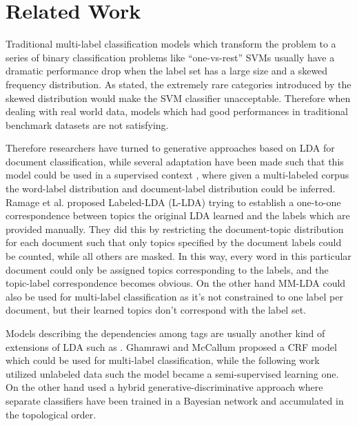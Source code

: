 \section{Related Work}
\label{sec:related}

Traditional multi-label classification models which transform the problem to a series of binary classification problems like ``one-vs-rest'' SVMs \cite{rifkin2004defense} usually have a dramatic performance drop when the label set has a large size and a skewed frequency distribution. As \cite{liu2005support} stated, the extremely rare categories introduced by the skewed distribution would make the SVM classifier unacceptable. Therefore when dealing with real world data, models which had good performances in traditional benchmark datasets are not satisfying. 

Therefore researchers have turned to generative approaches based on LDA \cite{blei2003latent} for document classification, while several adaptation have been made such that this model could be used in a supervised context \cite{mimno2012topic, blei2007supervised, ramage2009labeled, ramage2009clustering}, where given a multi-labeled corpus the word-label distribution and document-label distribution could be inferred. Ramage et al. proposed Labeled-LDA (L-LDA)\cite{ramage2009labeled} trying to establish a one-to-one correspondence between topics the original LDA learned and the labels which are provided manually. They did this by restricting the document-topic distribution for each document such that only topics specified by the document labels could be counted, while all others are masked. In this way, every word in this particular document could only be assigned topics corresponding to the labels, and the topic-label correspondence becomes obvious. On the other hand MM-LDA\cite{ramage2009clustering} could also be used for multi-label classification as it's not constrained to one label per document, but their learned topics don't correspond with the label set.

Models describing the dependencies among tags are usually another kind of extensions of LDA such as \cite{blei2006correlated, li2006pachinko, blei2003hierarchical, ghamrawi2005collective}. Ghamrawi and McCallum \cite{ghamrawi2005collective} proposed a CRF model which could be used for multi-label classification,  while the following work \cite{druck2007semi} utilized unlabeled data such the model became a semi-supervised learning one. On the other hand \cite{zhang2010multi} used a hybrid generative-discriminative approach where separate classifiers have been trained in a Bayesian network and accumulated in the topological order.